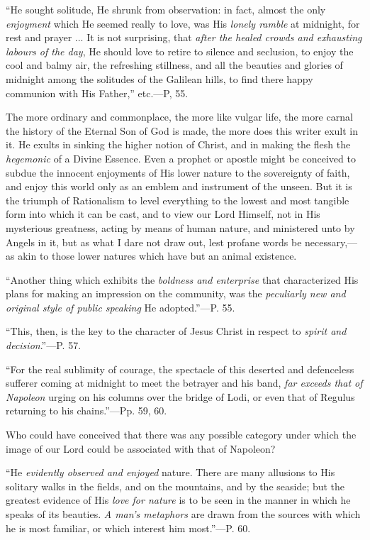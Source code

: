 ``He sought
solitude, He shrunk from observation: in fact, almost the only \emph{enjoyment}
which He seemed really to love, was His \emph{lonely ramble} at
midnight, for rest and prayer ... It is not surprising, that \emph{after
the healed crowds and exhausting labours of the day}, He should
love to retire to silence and seclusion, to enjoy the cool and balmy
air, the refreshing stillness, and all the beauties and glories of
midnight among the solitudes of the Galilean hills, to find there
happy communion with His Father,'' etc.—P, 55.

The more ordinary and commonplace, the more like
vulgar life, the more carnal the history of the Eternal Son of God is
made, the more does this writer exult in it. He exults in sinking the
higher notion of Christ, and in making the flesh the \emph{hegemonic}
of a Divine Essence. Even a prophet or apostle might be conceived to
subdue the innocent enjoyments of His lower nature to the sovereignty
of faith, and enjoy this world only as an emblem and instrument of the
unseen. But it is the triumph of Rationalism to level everything to
the lowest and most tangible form into which it can be cast, and to
view our Lord Himself, not in His mysterious greatness, acting by
means of human nature, and ministered unto by Angels in it, but as
what I dare not draw out, lest profane words be necessary,—as akin
to those lower natures which have but an animal existence.

``Another thing
which exhibits the \emph{boldness and enterprise} that characterized
His plans for making an impression on the community, was the \emph{peculiarly
new and original style of public speaking} He adopted.''—P. 55.

``This, then, is
the key to the character of Jesus Christ in respect to \emph{spirit and
decision}.''—P. 57.

``For the real
sublimity of courage, the spectacle of this deserted and defenceless
sufferer coming at midnight to meet the betrayer and his band, \emph{far
exceeds that of Napoleon} urging on his columns over the bridge of
Lodi, or even that of Regulus returning to his chains.''—Pp. 59,
60.

Who could have conceived that there was any
possible category under which the image of our Lord could be
associated with that of Napoleon?

``He \emph{evidently
observed and enjoyed} nature. There are many allusions to His
solitary walks in the fields, and on the mountains, and by the
seaside; but the greatest evidence of His \emph{love for nature} is to
be seen in the manner in which he speaks of its beauties. \emph{A man's
metaphors} are drawn from the sources with which he is most
familiar, or which interest him most.''—P. 60.

